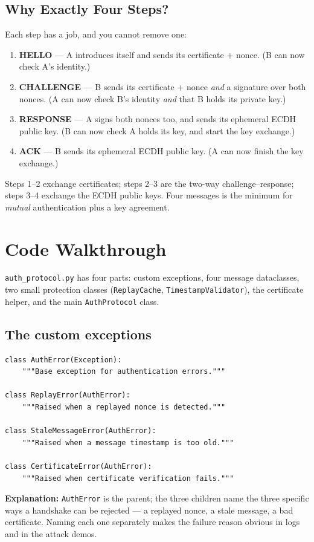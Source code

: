 \documentclass[11pt,a4paper]{report}
\begin{document}
\subsection{Why Exactly Four Steps?}
Each step has a job, and you cannot remove one:
\begin{enumerate}
  \item \textbf{HELLO} --- A introduces itself and sends its certificate + nonce.
        (B can now check A's identity.)
  \item \textbf{CHALLENGE} --- B sends its certificate + nonce \emph{and} a
        signature over both nonces. (A can now check B's identity \emph{and}
        that B holds its private key.)
  \item \textbf{RESPONSE} --- A signs both nonces too, and sends its ephemeral
        ECDH public key. (B can now check A holds its key, and start the key
        exchange.)
  \item \textbf{ACK} --- B sends its ephemeral ECDH public key. (A can now finish
        the key exchange.)
\end{enumerate}
Steps 1--2 exchange certificates; steps 2--3 are the two-way challenge--response;
steps 3--4 exchange the ECDH public keys. Four messages is the minimum for
\emph{mutual} authentication plus a key agreement.

\section{Code Walkthrough}

\texttt{auth\_protocol.py} has four parts: custom exceptions, four message
dataclasses, two small protection classes (\texttt{ReplayCache},
\texttt{TimestampValidator}), the certificate helper, and the main
\texttt{AuthProtocol} class.

\subsection{The custom exceptions}
\begin{lstlisting}[style=py,caption={auth\_protocol.py --- the exception hierarchy.}]
class AuthError(Exception):
    """Base exception for authentication errors."""

class ReplayError(AuthError):
    """Raised when a replayed nonce is detected."""

class StaleMessageError(AuthError):
    """Raised when a message timestamp is too old."""

class CertificateError(AuthError):
    """Raised when certificate verification fails."""
\end{lstlisting}
\textbf{Explanation:} \texttt{AuthError} is the parent; the three children name
the three specific ways a handshake can be rejected --- a replayed nonce, a stale
message, a bad certificate. Naming each one separately makes the failure reason
obvious in logs and in the attack demos.
\end{document}
